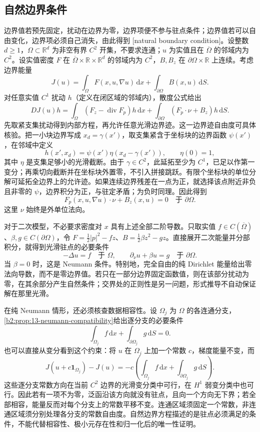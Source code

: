 \subsection{自然边界条件}
\label{b2:subsec:140203}

边界值若预先固定，扰动在边界为零，边界项便不参与驻点条件；边界值若可以自由变化，边界项必须自己消失，由此得到 [natural boundary condition]。设整数 \(d\geq1\)，\(\Omega\subset\mathbb R^d\) 为非空有界 \(C^2\) 开集，不要求连通；\(u\) 为实值且在 \(\overline\Omega\) 的邻域内为 \(C^2\)。设实值密度 \(F\) 在 \(\overline\Omega\times\mathbb R\times\mathbb R^d\) 的邻域内为 \(C^2\)，\(B,B_z\) 在 \(\partial\Omega\times\mathbb R\) 上连续。考虑边界能量
\[
 J(u)=\int_\Omega F(x,u,\nabla u)\,\mathrm dx
       +\int_{\partial\Omega}B(x,u)\,\mathrm dS.
\]
对任意实值 \(C^1\) 扰动 \(h\)（定义在闭区域的邻域内），散度公式给出
\[
 DJ(u)h=\int_\Omega(F_z-\operatorname{div}F_p)h\,\mathrm dx
       +\int_{\partial\Omega}(F_p\cdot\nu+B_z)h\,\mathrm dS.
\]
先取紧支集扰动得到内部方程，再允许任意光滑边界迹。这一边界迹自由度可具体核验。把一小块边界写成 \(x_d=\gamma(x')\)，取支集紧含于坐标块的边界函数 \(\psi(x')\)，在邻域中定义
\[h(x',x_d)=\psi(x')\eta(x_d-\gamma(x')),\qquad \eta(0)=1,\]
其中 \(\eta\) 是支集足够小的光滑截断。由于 \(\gamma\in C^2\)，此延拓至少为 \(C^1\)，已足以作第一变分；再乘切向截断并在坐标块外置零，不引入拼接跳跃。有限个坐标块的单位分解可延拓全边界上的允许迹。如果连续边界残差在一点为正，就选择该点附近非负且非零的 \(\psi\)，边界积分为正，与驻定矛盾；为负时同理。因此得到
\[F_p(x,u,\nabla u)\cdot\nu+B_z(x,u)=0\quad\text{于 }\partial\Omega.\]
这里 \(\nu\) 始终是外单位法向。

\ProseParagraphBreak

对于二次模型，不必要求密度对 \(x\) 具有上述全部二阶导数。只取实值 \(f\in C(\overline\Omega)\)、\(\beta,g\in C(\partial\Omega)\)，令 \(F=\tfrac12|p|^2-fz\)、\(B=\tfrac12\beta z^2-gz\)。直接展开二次能量并分部积分，就得到光滑驻点的必要条件
\[-\Delta u=f\quad\text{于 }\Omega,\qquad \partial_\nu u+\beta u=g\quad\text{于 }\partial\Omega.\]
当 \(\beta=0\) 时，这是 Neumann 条件。特别地，完全自由的纯 Dirichlet 能量给出零法向导数，而不是零边界值。若只在一部分边界固定函数值，则在该部分扰动为零，在其余部分产生自然条件；交界处的正则性是另一问题，形式推导不自动保证解在那里光滑。

在纯 Neumann 情形，还必须核查数据相容性。设 \(\Omega_j\) 为 \(\Omega\) 的各连通分支，\cref{b2:prop:13-neumann-compatibility}给出逐分支的必要条件
\[
 \int_{\Omega_j}f\,\mathrm{d}x
       +\int_{\partial\Omega_j}g\,\mathrm{d}S=0.
\]
也可以直接从变分看到这个约束：将 \(u\) 在 \(\Omega_j\) 上加一个常数 \(c\)，梯度能量不变，而
\[
 J(u+c\mathbf1_{\Omega_j})-J(u)
 =-c\left(\int_{\Omega_j}f\,\mathrm{d}x
                 +\int_{\partial\Omega_j}g\,\mathrm{d}S\right).
\]
这些逐分支常数方向在当前 \(C^2\) 边界的光滑变分类中可行，在 \(H^1\) 弱变分类中也可行。因此若有一项不为零，泛函沿该方向就没有驻点，且向一个方向无下界；若全部相容，能量反而对每个分支上的常数平移不变。连通区域须固定一个常数，非连通区域须分别处理各分支的常数自由度。自然边界方程描述的是驻点必须满足的条件，不能代替相容性、极小元存在性和归一化后的唯一性证明。

